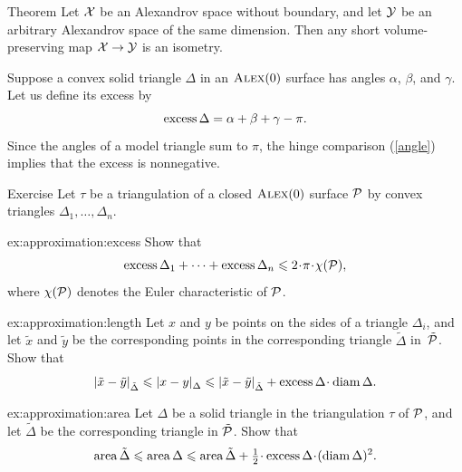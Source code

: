 \begin{thm}{Theorem}\label{thm:vol-short}
Let $\mathcal{X}$ be an Alexandrov space without boundary, and let $\mathcal{Y}$ be an arbitrary Alexandrov space of the same dimension.
Then any short volume-preserving map $\mathcal{X}\to\mathcal{Y}$ is an isometry.
\end{thm}

Suppose a convex solid triangle $\Delta$ in an $\textup{\textsc{Alex}}(0)$ surface has angles $\alpha$, $\beta$, and $\gamma$.
Let us define its excess by
\[\operatorname{\rm excess}\nolimits\Delta=\alpha+\beta+\gamma-\pi.\]
Since the angles of a model triangle sum to $\pi$,
the hinge comparison (\ref{angle}) implies that the excess is nonnegative.

\begin{thm}{Exercise}\label{ex:approximation}
Let $\tau$ be a triangulation of a closed $\textup{\textsc{Alex}}(0)$ surface $\mathcal{P}$ by convex triangles $\Delta_1,\dots,\Delta_n$.




\begin{subthm}{ex:approximation:excess}
Show that
\[\excess\Delta_1+\dots+\excess\Delta_n \le 2\cdot\pi\cdot \chi(\spc{P}),\]
where $\chi(\mathcal{P})$ denotes the Euler characteristic of $\mathcal{P}$.
\end{subthm}


\begin{subthm}{ex:approximation:length}
Let $x$ and $y$ be points on the sides of a triangle $\Delta_i$, and let $\tilde x$ and $\tilde y$ be the corresponding points in the corresponding triangle $\tilde \Delta$ in~$\tilde{\mathcal{P}}$.
Show that
\[\dist{\tilde x}{\tilde y}{\tilde \Delta}\le\dist{x}{y}{\Delta}\le \dist{\tilde x}{\tilde y}{\tilde \Delta}+\excess\Delta\cdot \diam \Delta.\]

\end{subthm}

\begin{subthm}{ex:approximation:area}
Let $\Delta$ be a solid triangle in the triangulation $\tau$ of $\mathcal{P}$, and let $\tilde \Delta$ be the corresponding triangle in $\tilde{\mathcal{P}}$.
Show that
\[\area \tilde \Delta\le \area \Delta\le \area \tilde \Delta+\tfrac12\cdot\excess\Delta\cdot (\diam \Delta)^2.\]

\end{subthm}

\end{thm}

